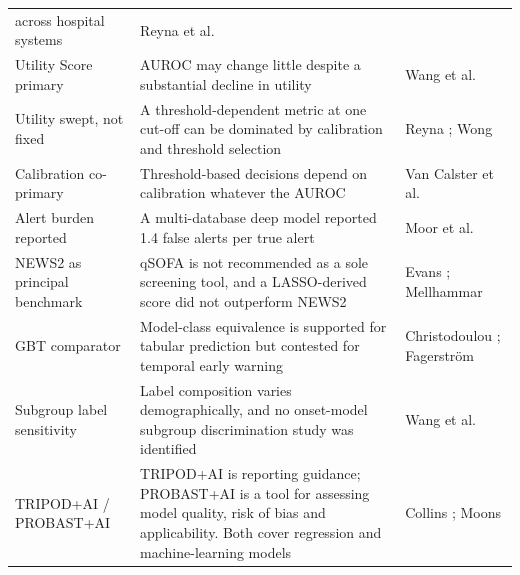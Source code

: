 {\begin{longtable}{p{3.1cm}p{5.6cm}p{4cm}}
        across hospital systems &
        Reyna et al.\ \cite{reyna2020utility} \\
        Utility Score primary & AUROC may change little despite a substantial
        decline in utility &
        Wang et al.\ \cite{wang2025srpm} \\
        Utility swept, not fixed & A threshold-dependent metric at one cut-off
        can be dominated by calibration and threshold selection &
        Reyna \cite{reyna2020utility};
        Wong \cite{wong2026epic} \\
        Calibration co-primary & Threshold-based decisions depend on
        calibration whatever the AUROC &
        Van Calster et al.\ \cite{vancalster2019calibration} \\
        Alert burden reported & A multi-database deep model reported 1.4 false
        alerts per true alert &
        Moor et al.\ \cite{moor2023review} \\
        NEWS2 as principal benchmark & qSOFA is not recommended as a sole
        screening tool, and a LASSO-derived score did not outperform NEWS2 &
        Evans \cite{evans2021ssc};
        Mellhammar \cite{mellhammar2020news2} \\
        GBT comparator & Model-class equivalence is supported for tabular
        prediction but contested for temporal early warning &
        Christodoulou \cite{christodoulou2019cox};
        Fagerstr{\"o}m \cite{fagerstrom2019lisep} \\
        Subgroup label sensitivity & Label composition varies demographically,
        and no onset-model subgroup discrimination study was identified &
        Wang et al.\ \cite{wang2022equity} \\
        TRIPOD+AI / PROBAST+AI & TRIPOD+AI is reporting guidance; PROBAST+AI
        is a tool for assessing model quality, risk of bias and applicability.
        Both cover regression and machine-learning models &
        Collins \cite{collins2024tripodai};
        Moons \cite{moons2025probastai} \\
\end{longtable}
}
